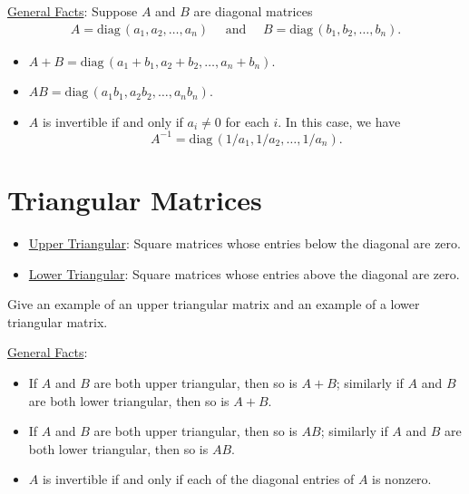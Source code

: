 \documentclass[12pt,a4paper]{article}
\newcounter{example}[section]
\begin{document}
	\vfill
	
	\newpage
	
	\phantom{2}
	
	\vfill
	
	\noindent\underline{General Facts}:
	Suppose $A$ and $B$ are diagonal matrices
		\begin{align*}
		A = \mathrm{diag}\, (a_1 , a_2 , \ldots , a_n ) \quad \text{ and } \quad B = \mathrm{diag}\, (b_1 , b_2 , \ldots , b_n ) .
		\end{align*}
	\begin{itemize}
	\item $A + B = \mathrm{diag} \, (a_1 + b_1 , a_2 + b_2 , \ldots , a_n + b_n )$.
	\item $AB = \mathrm{diag} \, (a_1 b_1 , a_2 b_2 , \ldots , a_n b_n )$.
	\item $A$ is invertible if and only if $a_i \neq 0$ for each $i$. In this case, we have 
		$$
		A^{-1} = \mathrm{diag}\, ( 1/a_1 , 1/a_2 , \ldots , 1/a_n ).
		$$
	\end{itemize}	
	
\newpage
	
\section{Triangular Matrices}

	\begin{itemize}
	\item \underline{Upper Triangular}: Square matrices whose entries below the diagonal are zero.
	\item \underline{Lower Triangular}: Square matrices whose entries above the diagonal are zero.
	\end{itemize}
	
	\begin{example}
	Give an example of an upper triangular matrix and an example of a lower triangular matrix.
	\end{example}
	

\newpage

\noindent\underline{General Facts}:
		\begin{itemize}
		\item If $A$ and $B$ are both upper triangular, then so is $A + B$; similarly if $A$ and $B$ are both lower triangular, then so is $A + B$.
		\item If $A$ and $B$ are both upper triangular, then so is $AB$; similarly if $A$ and $B$ are both lower triangular, then so is $AB$.
		\item $A$ is invertible if and only if each of the diagonal entries of $A$ is nonzero.
		\end{itemize}
\end{document}
